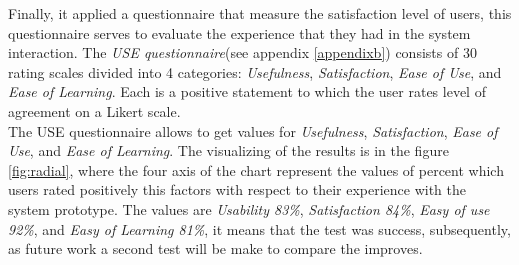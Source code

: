 Finally, it applied a questionnaire that measure the satisfaction
level of users, this questionnaire serves to evaluate the experience
that they had in the system interaction. The \textit{USE
questionnaire}(see appendix \ref{appendixb}) consists of 30 rating
scales divided into 4 categories: \textit{Usefulness},
\textit{Satisfaction}, \textit{Ease of Use}, and \textit{Ease of
Learning}. Each is a positive statement to which the user rates level
of agreement on a Likert scale. \\ The USE questionnaire allows to get
values for \textit{Usefulness}, \textit{Satisfaction}, \textit{Ease of
Use}, and \textit{Ease of Learning}. The visualizing of the results is in
the figure \ref{fig:radial}, where the four axis of the chart
represent the values of percent which users rated positively this
factors with respect to their experience with the system prototype.
The values are \textit{Usability 83\%}, \textit{Satisfaction 84\%},
\textit{Easy of use  92\%}, and \textit{Easy of Learning 81\%}, it
means that the test was success, subsequently, as future work  a
second test will be make to compare the improves.


